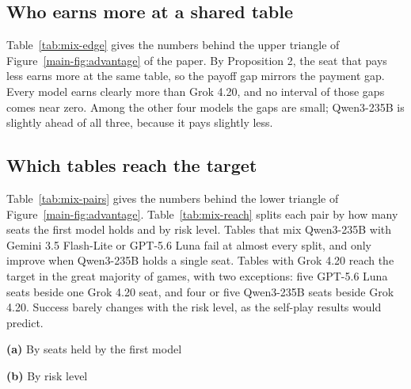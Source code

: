 \documentclass[10pt]{article}
\let\plainsubsection\subsection
\renewcommand{\subsection}{\FloatBarrier\needspace{8\baselineskip}\plainsubsection}
\begin{document}
\subsection{Who earns more at a shared table}

Table~\ref{tab:mix-edge} gives the numbers behind the upper triangle of Figure~\ref{main-fig:advantage} of the paper. By Proposition 2, the seat that pays less earns more at the same table, so the payoff gap mirrors the payment gap. Every model earns clearly more than Grok 4.20, and no interval of those gaps comes near zero. Among the other four models the gaps are small; Qwen3-235B is slightly ahead of all three, because it pays slightly less.

\begin{table}[h]
\caption{Two models at one table (150 games per pair, pooled over seat splits and risk levels). Top: expected payoff per seat of the row model minus that of the column model in the same games, with its interval below. Bottom: units paid per seat, row minus column.}
\label{tab:mix-edge}
\centering\small

\end{table}

\subsection{Which tables reach the target}

Table~\ref{tab:mix-pairs} gives the numbers behind the lower triangle of Figure~\ref{main-fig:advantage}. Table~\ref{tab:mix-reach} splits each pair by how many seats the first model holds and by risk level. Tables that mix Qwen3-235B with Gemini 3.5 Flash-Lite or GPT-5.6 Luna fail at almost every split, and only improve when Qwen3-235B holds a single seat. Tables with Grok 4.20 reach the target in the great majority of games, with two exceptions: five GPT-5.6 Luna seats beside one Grok 4.20 seat, and four or five Qwen3-235B seats beside Grok 4.20. Success barely changes with the risk level, as the self-play results would predict.

\begin{table}[h]
\caption{Games reaching the target: count out of 150 for each pair, and out of 60 for self-play on the diagonal (the base grid and the rerun at $p=0.1$, $0.5$ and $0.9$).}
\label{tab:mix-pairs}
\centering\small

\end{table}

\begin{table}[h]
\caption{Games reaching the target (\%). (a) By the number of seats the first-named model holds, pooled over risk levels (30 games per entry; \emph{All}: 150). (b) By risk level, pooled over seat splits (50 games per entry), with self-play at the same risk levels (20 games per entry).}
\label{tab:mix-reach}
\centering\small
\textbf{(a)} By seats held by the first model\par\smallskip
\par\bigskip
\textbf{(b)} By risk level\par\smallskip

\end{table}
\end{document}

